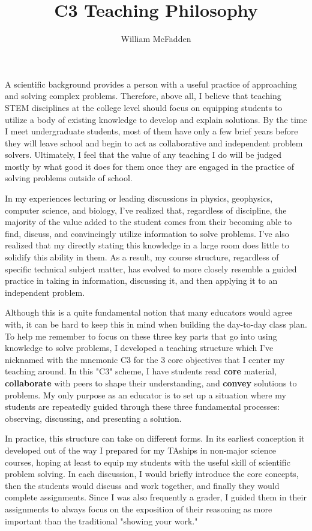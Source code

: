\documentclass[12pt]{amsart} \usepackage{amssymb}
\title[]{C3 Teaching Philosophy}
\author[]{William McFadden}
\begin{document}
\maketitle
\thispagestyle{empty}

A scientific background provides a person with a useful practice of approaching and solving complex problems. Therefore, above all, I believe that teaching STEM disciplines at the college level should focus on equipping students to utilize a body of existing knowledge to develop and explain solutions. By the time I meet undergraduate students, most of them have only a few brief years before they will leave school and begin to act as collaborative and independent problem solvers. Ultimately, I feel that the value of any teaching I do will be judged mostly by what good it does for them once they are engaged in the practice of solving problems outside of school. 

In my experiences lecturing or leading discussions in physics, geophysics, computer science, and biology, I've realized that, regardless of discipline, the majority of the value added to the student comes from their becoming able to find, discuss, and convincingly utilize information to solve problems. I've also realized that my directly stating this knowledge in a large room does little to solidify this ability in them. As a result, my course structure, regardless of specific technical subject matter, has evolved to more closely resemble a guided practice in taking in information, discussing it, and then applying it to an independent problem. 

Although this is a quite fundamental notion that many educators would agree with, it can be hard to keep this in mind when building the day-to-day class plan.  To help me remember to focus on these three key parts that go into using knowledge to solve problems, I developed a teaching structure which I've nicknamed with the mnemonic C3 for the 3 core objectives that I center my teaching around. In this "C3" scheme, I have students read \textbf{core} material, \textbf{collaborate} with peers to shape their understanding, and \textbf{convey} solutions to problems. My only purpose as an educator is to set up a situation where my students are repeatedly guided through these three fundamental processes: observing, discussing, and presenting a solution.

In practice, this structure can take on different forms.  In its earliest conception it developed out of the way I prepared for my TAships in non-major science courses, hoping at least to equip my students with the useful skill of scientific problem solving.  In each discussion, I would briefly introduce the core concepts, then the students would discuss and work together, and finally they would complete assignments.  Since I was also frequently a grader, I guided them in their assignments to always focus on the exposition of their reasoning as more important than the traditional "showing your work." 
\end{document}
